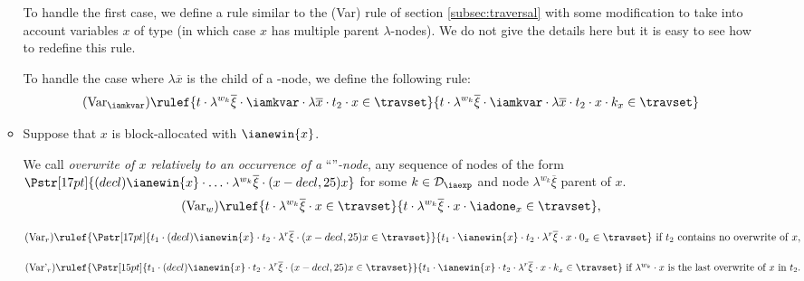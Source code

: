\begin{itemize}
\begin{itemize}
To handle the first case, we define a rule similar to the (Var) rule
of section \ref{subsec:traversal} with some modification to take
into account variables $x$ of type \iavar (in which case $x$ has
multiple parent $\lambda$-nodes). We do not give the details here
but it is easy to see how to redefine this rule.

To handle the case where $\lambda \overline{x}$ is the child of a
\iamkvar-node, we define the following rule:
$$ (\mbox{Var}_{\iamkvar})  \rulef{t \cdot \lambda^{w_k} \overline{\xi} \cdot \iamkvar \cdot \lambda \overline{x} \cdot t_2 \cdot x \in \travset}
{t \cdot \lambda^{w_k} \overline{\xi} \cdot \iamkvar \cdot \lambda
\overline{x} \cdot t_2 \cdot x \cdot k_{x} \in \travset }
$$

\item Suppose that $x$ is block-allocated with $\ianewin{x}$.

We call \emph{overwrite of $x$ relatively to an occurrence of a} ``''\emph{-node}, any sequence of nodes of the form
$\Pstr[17pt]{(decl){\ianewin{x}}\cdot \ldots \cdot \lambda^{w_k}\overline{\xi} \cdot (x-decl,25){x}}$ for some $k\in \mathcal{D}_{\iaexp}$ and node $\lambda^{w_k}\overline{\xi}$ parent
of $x$.
$$(\mbox{Var}_w)
    \rulef{
        t \cdot \lambda^{w_k} \overline{\xi} \cdot x \in \travset
    }
    {   t \cdot \lambda^{w_k} \overline{\xi} \cdot x \cdot \iadone_x \in
        \travset
    },
$$

$$(\mbox{Var}_r)
    \rulef{
        \Pstr[17pt]{t_1 \cdot (decl){\ianewin{x}} \cdot t_2 \cdot \lambda^r \overline{\xi} \cdot (x-decl,25){x} \in \travset}
    }
    {   t_1 \cdot \ianewin{x} \cdot t_2 \cdot \lambda^r \overline{\xi}
        \cdot x \cdot 0_x \in \travset
    }
    \mbox{ if $t_2$ contains no overwrite of $x$},
$$

$$(\mbox{Var'}_r)
    \rulef{
        \Pstr[15pt]{
            t_1 \cdot (decl){\ianewin{x}} \cdot t_2 \cdot \lambda^r \overline{\xi} \cdot (x-decl,25){x} \in \travset
        }
    }
    {
        t_1 \cdot \ianewin{x} \cdot t_2 \cdot \lambda^r \overline{\xi} \cdot x \cdot k_x \in \travset
    }
    \mbox{ if $\lambda^{w_k} \cdot x$ is the last overwrite of $x$ in } t_2. $$
\end{itemize}
\end{itemize}

